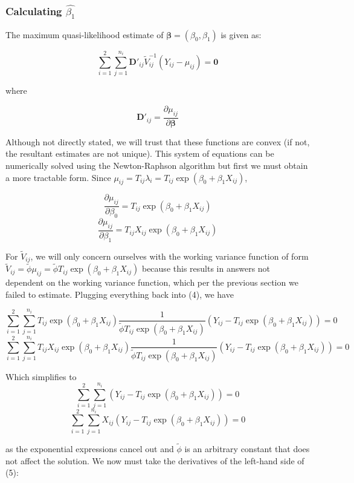 \documentclass{article}
\begin{document}
\subsubsection{Calculating $\hat{\beta_1}$}

The maximum quasi-likelihood estimate of $\bm{\beta}=(\beta_0, \beta_1)$ is
given as:

\begin{equation}
	\sum_{i=1}^2 \sum_{j=1}^{n_i} \bm{D}'_{ij} \tilde{V}_{ij}^{-1}(Y_{ij}-\mu_{ij})
	= \bm{0}
\end{equation}

where 

$$
\bm{D}'_{ij} = \frac{\partial \mu_{ij}}{\partial \bm{\beta}}
$$ 

Although not directly stated, we will trust that these functions are convex (if
not, the resultant estimates are not unique). This system of equations can be numerically solved using the 
Newton-Raphson algorithm but first we must obtain a more tractable form. Since
$\mu_{ij} = T_{ij}\lambda_i = T_{ij}\exp{(\beta_0 + \beta_1 X_{ij})}$,

$$
\frac{\partial \mu_{ij}}{\partial \beta_0} = T_{ij} \exp{(\beta_0 + \beta_1 X_{ij})}
$$
$$
\frac{\partial \mu_{ij}}{\partial \beta_1} = T_{ij}X_{ij} \exp{(\beta_0 + \beta_1 X_{ij})}
$$

For $\tilde{V}_{ij}$, we will only concern ourselves with the working variance
function of form $\tilde{V}_{ij} = \tilde{\phi} \mu_{ij} =
\tilde{\phi} T_{ij} \exp{(\beta_0 + \beta_1 X_{ij})}$ because this results in
answers not dependent on the working variance function, which per the previous
section we failed to estimate. Plugging everything back into
(4), we have

$$
\sum_{i=1}^2 \sum_{j=1}^{n_i}  T_{ij} \exp{(\beta_0 + \beta_1 X_{ij})}
\frac{1}{\tilde{\phi} T_{ij} \exp{(\beta_0 + \beta_1 X_{ij})}} 
(Y_{ij} - T_{ij} \exp{(\beta_0 + \beta_1 X_{ij})}) = 0
$$
$$
\sum_{i=1}^2 \sum_{j=1}^{n_i} T_{ij} X_{ij} \exp{(\beta_0 + \beta_1 X_{ij})}
\frac{1}{\tilde{\phi} T_{ij} \exp{(\beta_0 + \beta_1 X_{ij})}} 
(Y_{ij} - T_{ij} \exp{(\beta_0 + \beta_1 X_{ij})}) = 0
$$

Which simplifies to
$$
\sum_{i=1}^2 \sum_{j=1}^{n_i} (Y_{ij} - T_{ij} \exp{(\beta_0 + \beta_1 X_{ij})}) = 0
$$
\begin{equation}
	\sum_{i=1}^2 \sum_{j=1}^{n_i} X_{ij} (Y_{ij} - T_{ij} \exp{(\beta_0 + \beta_1 X_{ij})}) = 0
\end{equation}

as the exponential expressions cancel out and $\tilde{\phi}$ is an arbitrary
constant that does not affect the solution. We now must take the derivatives of
the left-hand side of 
(5):
\end{document}
